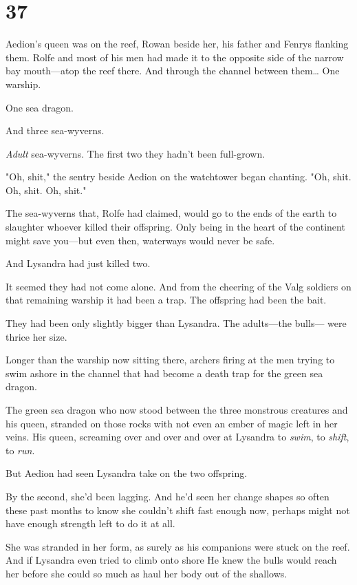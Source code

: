 
\chapter{37}

Aedion's queen was on the reef, Rowan beside her, his father and Fenrys flanking them. Rolfe and most of his men had made it to the opposite side of the narrow bay mouth---atop the reef there. And through the channel between them\ldots{} One warship.

One sea dragon.

And three sea-wyverns.

\emph{Adult} sea-wyverns. The first two  they hadn't been full-grown.

"Oh, shit," the sentry beside Aedion on the watchtower began chanting. "Oh, shit. Oh, shit. Oh, shit."

The sea-wyverns that, Rolfe had claimed, would go to the ends of the earth to slaughter whoever killed their offspring. Only being in the heart of the continent might save you---but even then, waterways would never be safe.

And Lysandra had just killed two.

It seemed they had not come alone. And from the cheering of the Valg soldiers on that remaining warship  it had been a trap. The offspring had been the bait.

They had been only slightly bigger than Lysandra. The adults---the bulls--- were thrice her size.

Longer than the warship now sitting there, archers firing at the men trying to swim ashore in the channel that had become a death trap for the green sea dragon.

The green sea dragon who now stood between the three monstrous creatures and his queen, stranded on those rocks with not even an ember of magic left in her veins. His queen, screaming over and over and over at Lysandra to \emph{swim}, to \emph{shift}, to \emph{run}.

But Aedion had seen Lysandra take on the two offspring.

By the second, she'd been lagging. And he'd seen her change shapes so often these past months to know she couldn't shift fast enough now, perhaps might not have enough strength left to do it at all.

She was stranded in her form, as surely as his companions were stuck on the reef. And if Lysandra even tried to climb onto shore  He knew the bulls would reach her before she could so much as haul her body out of the shallows.


